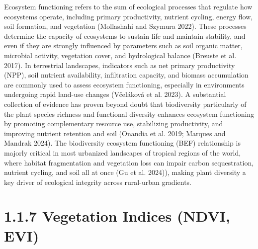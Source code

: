Ecosystem functioning refers to the sum of ecological processes that regulate how ecosystems operate, including primary productivity, nutrient cycling, energy flow, soil formation, and vegetation (Mollashahi and Szymura 2022). These processes determine the capacity of ecosystems to sustain life and maintain stability, and even if they are strongly influenced by parameters such as soil organic matter, microbial activity, vegetation cover, and hydrological balance (Breuste et al. 2017). In terrestrial landscapes, indicators such as net primary productivity (NPP), soil nutrient availability, infiltration capacity, and biomass accumulation are commonly used to assess ecosystem functioning, especially in environments undergoing rapid land-use changes (Včeláková et al. 2023). A substantial collection of evidence has proven beyond doubt that biodiversity particularly of the plant species richness and functional diversity enhances ecosystem functioning by promoting complementary resource use, stabilizing productivity, and improving nutrient retention and soil (Onandia et al. 2019; Marques and Mandrak 2024). The biodiversity ecosystem functioning (BEF) relationship is majorly critical in most urbanized landscapes of tropical regions of the world, where habitat fragmentation and vegetation loss can impair carbon sequestration, nutrient cycling, and soil all at once (Gu et al. 2024)), making plant diversity a key driver of ecological integrity across rural-urban gradients.
\hypertarget{vegetation-indices-ndvi-evi}{%
\section{\texorpdfstring{\textbf{1.1.7 Vegetation Indices (NDVI, EVI)}}{1.1.7 Vegetation Indices (NDVI, EVI)}}\label{vegetation-indices-ndvi-evi}}

